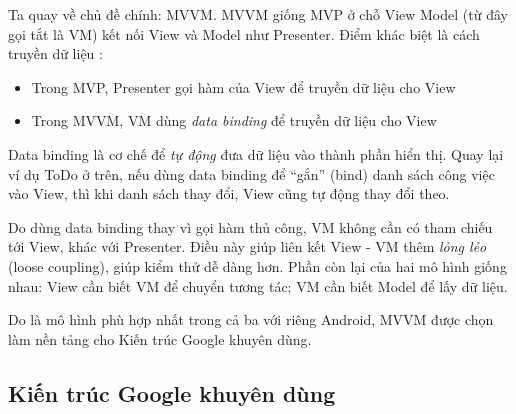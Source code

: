 \documentclass[../../thesis]{subfiles}
\begin{document}
Ta quay về chủ đề chính: MVVM. MVVM giống MVP ở chỗ View Model (từ đây gọi tắt
là VM) kết nối View và Model như Presenter. Điểm khác biệt là cách truyền dữ
liệu \cite{MUN_MVVM}:

\begin{itemize}
    \item
          Trong MVP, Presenter gọi hàm của View để truyền dữ liệu cho View
\end{itemize}

\begin{itemize}[resume, before = \vspace*{-\dimexpr\topsep+\partopsep\relax}]
    \item
          Trong MVVM, VM dùng \emph{data binding} để truyền dữ liệu cho View
\end{itemize}

Data binding là cơ chế để \emph{tự động} đưa dữ liệu vào thành phần hiển thị.
Quay lại ví dụ ToDo ở trên, nếu dùng data binding để ``gắn'' (bind) danh sách
công việc vào View, thì khi danh sách thay đổi, View cũng tự động thay đổi theo.

Do dùng data binding thay vì gọi hàm thủ công, VM không cần có tham chiếu tới
View, khác với Presenter. Điều này giúp liên kết View - VM thêm \emph{lỏng lẻo}
(loose coupling), giúp kiểm thử dễ dàng hơn. Phần còn lại của hai mô hình giống
nhau: View cần biết VM để chuyển tương tác; VM cần biết Model để lấy dữ liệu.

Do là mô hình phù hợp nhất trong cả ba với riêng Android, MVVM được chọn làm nền
tảng cho Kiến trúc Google khuyên dùng.

\subsection{Kiến trúc Google khuyên dùng}
\end{document}
